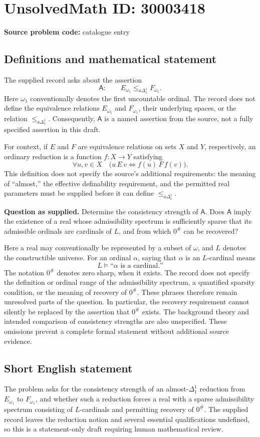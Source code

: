 \documentclass[11pt]{article}
\begin{document}
\section*{UnsolvedMath ID: 30003418}
\textbf{Source problem code:} catalogue entry
\subsection{Definitions and mathematical statement}
The supplied record asks about the assertion
\[
\mathsf{A}:\qquad E_{\omega_1}\leq_{a\Delta^1_1}F_{\omega_1}.
\]
Here \(\omega_1\) conventionally denotes the first uncountable ordinal. The record does not define the equivalence relations \(E_{\omega_1}\) and \(F_{\omega_1}\), their underlying spaces, or the relation \(\leq_{a\Delta^1_1}\). Consequently, \(\mathsf{A}\) is a named assertion from the source, not a fully specified assertion in this draft.

For context, if \(E\) and \(F\) are equivalence relations on sets \(X\) and \(Y\), respectively, an ordinary reduction is a function \(f:X\to Y\) satisfying
\[
\forall u,v\in X\quad \bigl(u\,E\,v\iff f(u)\,F\,f(v)\bigr).
\]
This definition does not specify the source's additional requirements: the meaning of ``almost,'' the effective definability requirement, and the permitted real parameters must be supplied before it can define \(\leq_{a\Delta^1_1}\).

\textbf{Question as supplied.} Determine the consistency strength of \(\mathsf{A}\). Does \(\mathsf{A}\) imply the existence of a real whose admissibility spectrum is sufficiently sparse that its admissible ordinals are cardinals of \(L\), and from which \(0^\#\) can be recovered?

Here a real may conventionally be represented by a subset of \(\omega\), and \(L\) denotes the constructible universe. For an ordinal \(\alpha\), saying that \(\alpha\) is an \(L\)-cardinal means
\[
L\models\text{``}\alpha\text{ is a cardinal.''}
\]
The notation \(0^\#\) denotes zero sharp, when it exists. The record does not specify the definition or ordinal range of the admissibility spectrum, a quantified sparsity condition, or the meaning of recovery of \(0^\#\). These phrases therefore remain unresolved parts of the question. In particular, the recovery requirement cannot silently be replaced by the assertion that \(0^\#\) exists. The background theory and intended comparison of consistency strengths are also unspecified. These omissions prevent a complete formal statement without additional source evidence.
\subsection{Short English statement}
The problem asks for the consistency strength of an almost-\(\Delta^1_1\) reduction from \(E_{\omega_1}\) to \(F_{\omega_1}\), and whether such a reduction forces a real with a sparse admissibility spectrum consisting of \(L\)-cardinals and permitting recovery of \(0^\#\). The supplied record leaves the reduction notion and several essential qualifications undefined, so this is a statement-only draft requiring human mathematical review.
\end{document}

